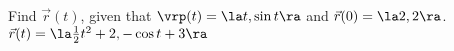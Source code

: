 {Find $\vec r(t)$, given that $\vrp(t) = \la t,\sin t\ra$ and $\vec r(0) = \la 2,2\ra$.
}
{
$\vec r(t) = \la \frac12t^2+2,-\cos t+3\ra$
}

